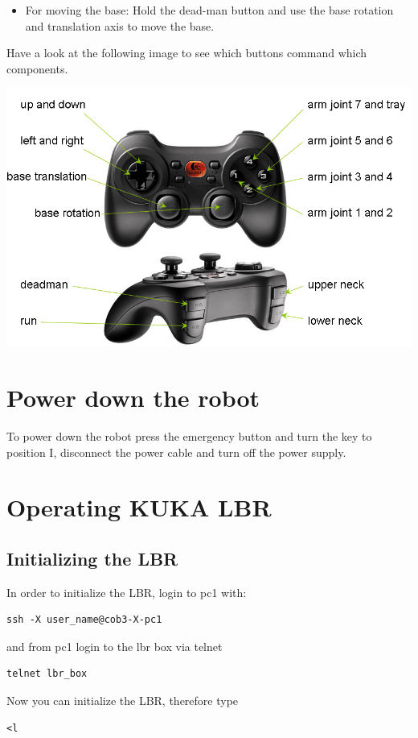\begin{itemize}
\item For moving the base: Hold the dead-man button and use the base rotation and translation axis to move the base.
\end{itemize}

Have a look at the following image to see which buttons command which components. 
\begin{center}
\includegraphics[width=1\textwidth]{images/joystick.png}
\end{center}

\section{Power down the robot}
To power down the robot press the emergency button and turn the key to position I, disconnect the power cable and turn off the power supply.

\section{Operating KUKA LBR} \label{LBR}
\subsection{Initializing the LBR}\label{lbr_init}
In order to initialize the LBR, login to pc1 with:
\begin{lstlisting}
ssh -X user_name@cob3-X-pc1
\end{lstlisting}
and from pc1 login to the lbr box via telnet
\begin{lstlisting}
telnet lbr_box
\end{lstlisting}

Now you can initialize the LBR, therefore type
\begin{lstlisting}
<l
\end{lstlisting}

